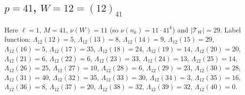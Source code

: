 \subsection*{$p=41$, $W=12=(12)_{41}$}
Here $\ell=1$, $M=41$, $\nu(W)=11$ (so $\nu(n_k)=11\cdot41^k$) and $|\mathcal T_W|=29$.
Label function: $\Lambda_{12}(12)=5$, $\Lambda_{12}(13)=8$, $\Lambda_{12}(14)=9$, $\Lambda_{12}(15)=29$, $\Lambda_{12}(16)=5$, $\Lambda_{12}(17)=35$, $\Lambda_{12}(18)=24$, $\Lambda_{12}(19)=14$, $\Lambda_{12}(20)=20$, $\Lambda_{12}(21)=6$, $\Lambda_{12}(22)=6$, $\Lambda_{12}(23)=33$, $\Lambda_{12}(24)=13$, $\Lambda_{12}(25)=14$, $\Lambda_{12}(26)=25$, $\Lambda_{12}(27)=10$, $\Lambda_{12}(28)=6$, $\Lambda_{12}(29)=23$, $\Lambda_{12}(30)=28$, $\Lambda_{12}(31)=40$, $\Lambda_{12}(32)=35$, $\Lambda_{12}(33)=30$, $\Lambda_{12}(34)=3$, $\Lambda_{12}(35)=16$, $\Lambda_{12}(36)=8$, $\Lambda_{12}(37)=20$, $\Lambda_{12}(38)=32$, $\Lambda_{12}(39)=32$, $\Lambda_{12}(40)=0$.
